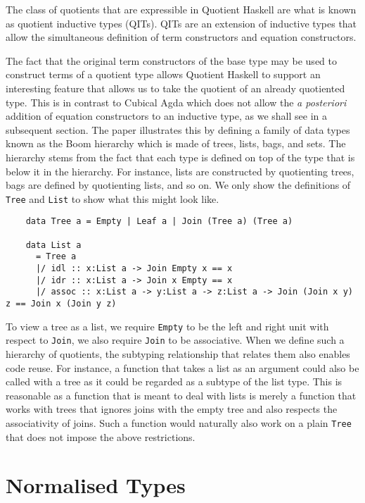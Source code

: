 \documentclass[12pt,twoside,maitrise]{dms}
\theoremstyle{definition}
\numberwithin{equation}{section}
\numberwithin{table}{chapter}
\numberwithin{figure}{chapter}
\newcommand\id[1] {\texttt{#1}}
\newcommand\latinphrase{\textit}
\begin{document}
The class of quotients that are expressible in Quotient Haskell are what is
known as quotient inductive types (QITs)\cite{fiore2022quotients, HoTTbook}.
QITs are an extension of inductive types that allow the simultaneous definition
of term constructors and equation constructors.

The fact that the original term constructors of the base type may be used to
construct terms of a quotient type allows Quotient Haskell to support an
interesting feature that allows us to take the quotient of an already
quotiented type. This is in contrast to Cubical Agda which does not allow the
\latinphrase{a posteriori} addition of equation constructors to an inductive
type, as we shall see in a subsequent section. The paper illustrates this by
defining a family of data types known as the Boom
hierarchy\cite{meertens1986algorithmics} which is made of trees, lists, bags,
and sets. The hierarchy stems from the fact that each type is defined on top of
the type that is below it in the hierarchy. For instance, lists are constructed
by quotienting trees, bags are defined by quotienting lists, and so on. We only
show the definitions of \id{Tree} and \id{List} to show what this might look
like.

\begin{verbatim}
    data Tree a = Empty | Leaf a | Join (Tree a) (Tree a)

    data List a
      = Tree a
      |/ idl :: x:List a -> Join Empty x == x
      |/ idr :: x:List a -> Join x Empty == x
      |/ assoc :: x:List a -> y:List a -> z:List a -> Join (Join x y) z == Join x (Join y z)
\end{verbatim}

To view a tree as a list, we require \id{Empty} to be the left and right unit
with respect to \id{Join}, we also require \id{Join} to be associative. When we
define such a hierarchy of quotients, the subtyping relationship that relates
them also enables code reuse. For instance, a function that takes a list as an
argument could also be called with a tree as it could be regarded as a subtype
of the list type. This is reasonable as a function that is meant to deal with
lists is merely a function that works with trees that ignores joins with the
empty tree and also respects the associativity of joins. Such a function would
naturally also work on a plain \id{Tree} that does not impose the above
restrictions.

\section{Normalised Types}\label{sec:normalised-types-courtieu}
\end{document}
